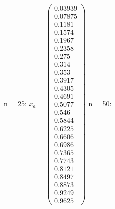 \documentclass{udpreport}
\begin{document}
\begin{enumerate}
\begin {enumerate}
\begin{enumerate}
\begin{itemize}
					 n = 25: 
					$x_{a} = \left(\begin{array}{c} 0.03939\\ 0.07875\\ 0.1181\\ 0.1574\\ 0.1967\\ 0.2358\\ 0.275\\ 0.314\\ 0.353\\ 0.3917\\ 0.4305\\ 0.4691\\ 0.5077\\ 0.546\\ 0.5844\\ 0.6225\\ 0.6606\\ 0.6986\\ 0.7365\\ 0.7743\\ 0.8121\\ 0.8497\\ 0.8873\\ 0.9249\\ 0.9625 \end{array}\right) $	
					 n = 50:

\end{itemize}
\end{enumerate}
\end{enumerate}
\end{enumerate}
\end{document}
